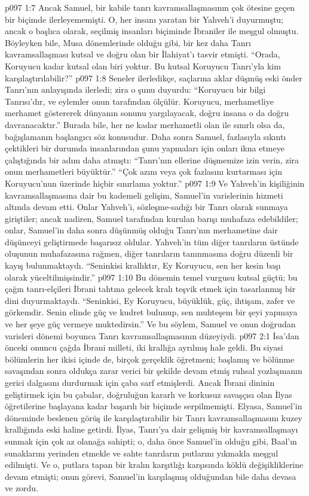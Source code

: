 \vs p097 1:7 Ancak Samuel, bir kabile tanrı kavramsallaşmasının çok ötesine geçen bir biçimde ilerleyememişti. O, her insanı yaratan bir Yahveh’i duyurmuştu; ancak o başlıca olarak, seçilmiş insanları biçiminde İbraniler ile meşgul olmuştu. Böyleyken bile, Musa dönemlerinde olduğu gibi, bir kez daha Tanrı kavramsallaşması kutsal ve doğru olan bir İlahiyat’ı tasvir etmişti. “Orada, Koruyucu kadar kutsal olan biri yoktur. Bu kutsal Koruyucu Tanrı’yla kim karşılaştırılabilir?”
\vs p097 1:8 Seneler ilerledikçe, saçlarına aklar düşmüş eski önder Tanrı’nın anlayışında ilerledi; zira o şunu duyurdu: “Koruyucu bir bilgi Tanrısı’dır, ve eylemler onun tarafından ölçülür. Koruyucu, merhametliye merhamet göstererek dünyanın sonunu yargılayacak, doğru insana o da doğru davranacaktır.” Burada bile, her ne kadar merhametli olan ile sınırlı olsa da, bağışlamanın başlangıcı söz konusudur. Daha sonra Samuel, fazlasıyla sıkıntı çektikleri bir durumda insanlarından şunu yapmaları için onları ikna etmeye çalıştığında bir adım daha atmıştı: “Tanrı’nın ellerine düşmemize izin verin, zira onun merhametleri büyüktür.” “Çok azını veya çok fazlasını kurtarması için Koruyucu’nun üzerinde hiçbir sınırlama yoktur.”
\vs p097 1:9 Ve Yahveh’in kişiliğinin kavramsallaşmasına dair bu kademeli gelişim, Samuel’in varislerinin hizmeti altında devam etti. Onlar Yahveh’i, sözleşme\hyp{}sadığı bir Tanrı olarak sunmaya giriştiler; ancak nadiren, Samuel tarafından kurulan barışı muhafaza edebildiler; onlar, Samuel’in daha sonra düşünmüş olduğu Tanrı’nın merhametine dair düşünceyi geliştirmede başarısız oldular. Yahveh’in tüm diğer tanrıların üstünde oluşunun muhafazasına rağmen, diğer tanrıların tanınmasına doğru düzenli bir kayış bulunmaktaydı. “Seninkisi krallıktır, Ey Koruyucu, sen her kesin başı olarak yüceltilmişsindir.”
\vs p097 1:10 Bu dönemin temel vurgusu kutsal güçtü; bu çağın tanrı\hyp{}elçileri İbrani tahtına gelecek kralı teşvik etmek için tasarlanmış bir dini duyurmaktaydı. “Seninkisi, Ey Koruyucu, büyüklük, güç, ihtişam, zafer ve görkemdir. Senin elinde güç ve kudret bulunup, sen muhteşem bir şeyi yapmaya ve her şeye güç vermeye muktedirsin.” Ve bu söylem, Samuel ve onun doğrudan varisleri dönemi boyunca Tanrı kavramsallaşmasının düzeyiydi.
\vs p097 2:1 İsa’dan önceki onuncu çağda İbrani milleti, iki krallığa ayrılmış hale geldi. Bu siyasi bölümlerin her ikisi içinde de, birçok gerçeklik öğretmeni; başlamış ve bölünme savaşından sonra oldukça zarar verici bir şekilde devam etmiş ruhsal yozlaşmanın gerici dalgasını durdurmak için çaba sarf etmişlerdi. Ancak İbrani dininin geliştirmek için bu çabalar, doğruluğun kararlı ve korkusuz savaşçısı olan İlyas öğretilerine başlayana kadar başarılı bir biçimde serpilmemişti. Elyasa, Samuel’in döneminde beslenen görüş ile karşılaştırabilir bir Tanrı kavramsallaşmasını kuzey krallığında eski haline getirdi. İlyas, Tanrı’ya dair gelişmiş bir kavramsallaşmayı sunmak için çok az olanağa sahipti; o, daha önce Samuel’in olduğu gibi, Baal’ın sunaklarını yerinden etmekle ve sahte tanrıların putlarını yıkmakla meşgul edilmişti. Ve o, putlara tapan bir kralın karşıtlığı karşısında köklü değişikliklerine devam etmişti; onun görevi, Samuel’in karşılaşmış olduğundan bile daha devasa ve zordu.
